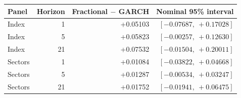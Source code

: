 \begin{tabular}{lrrr}
\toprule
Panel & Horizon & Fractional $-$ GARCH & Nominal 95\% interval \\
\midrule
Index & 1 & +0.05103 & $[-0.07687,\ +0.17028]$ \\
Index & 5 & +0.05823 & $[-0.00257,\ +0.12630]$ \\
Index & 21 & +0.07532 & $[-0.01504,\ +0.20011]$ \\
Sectors & 1 & +0.01084 & $[-0.03822,\ +0.04668]$ \\
Sectors & 5 & +0.01287 & $[-0.00534,\ +0.03247]$ \\
Sectors & 21 & +0.01752 & $[-0.01941,\ +0.06475]$ \\
\bottomrule
\end{tabular}
